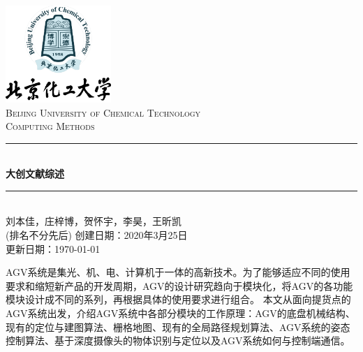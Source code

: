 \documentclass[cs4size,a4paper]{ctexart}
\numberwithin{equation}{section}
\numberwithin{table}{section}
\numberwithin{figure}{section}
\newcommand{\HRule}{\rule{\linewidth}{0.5mm}}
\begin{document}
\newtheorem{example}{例}              	%
\newtheorem{algorithem}{算法}	
\newtheorem{theorem}{定理}            	%
\newtheorem{definition}{定义}
\newtheorem{axiom}{公理}
\newtheorem{property}{性质}
\newtheorem{proposition}{命题}
\newtheorem{lemma}{引理}
\newtheorem{corollary}{推论}
\newtheorem{remark}{注解}
\newtheorem{condition}{条件}
\newtheorem{conclusion}{结论}
\newtheorem{assumption}{假设}
\renewcommand{\contentsname}{目录}     
\renewcommand{\abstractname}{摘要} 
\renewcommand{\refname}{参考文献}     
\renewcommand{\indexname}{索引}
\renewcommand{\figurename}{图}
\renewcommand{\tablename}{表}
\renewcommand{\appendixname}{附录}
\renewcommand{\proofname}{证明}
\renewcommand\emph[1]{\textcolor{black}{\textbf{#1}}}
\begin{titlepage}
\begin{center}
\includegraphics[width=0.30\textwidth]{logo}\\[1cm]    
\textsc{\Large Beijing University of Chemical Technology}\\[1.0cm]
\textsc{\Large Computing Methods}\\[0.5cm]
\HRule \\[0.8cm]
{\huge \bfseries 大创文献综述}\\[0.4cm]
\HRule \\[0.7cm]
\textsc{刘本佳，庄梓博，贺怀宇，李昊，王昕凯\\(排名不分先后)}
\tableofcontents 
\vfill
{创建日期：2020年3月25日}\\
{更新日期：\today}
\end{center}
\end{titlepage}
\pagestyle{plain}
\thispagestyle{empty}
\pagestyle{fancy}

\abstract
AGV系统是集光、机、电、计算机于一体的高新技术。为了能够适应不同的使用要求和缩短新产品的开发周期，AGV的设计研究趋向于模块化，将AGV的各功能模块设计成不同的系列，再根据具体的使用要求进行组合。
本文从面向提货点的AGV系统出发，介绍AGV系统中各部分模块的工作原理：AGV的底盘机械结构、现有的定位与建图算法、栅格地图、现有的全局路径规划算法、AGV系统的姿态控制算法、基于深度摄像头的物体识别与定位以及AGV系统如何与控制端通信。
\end{document}
